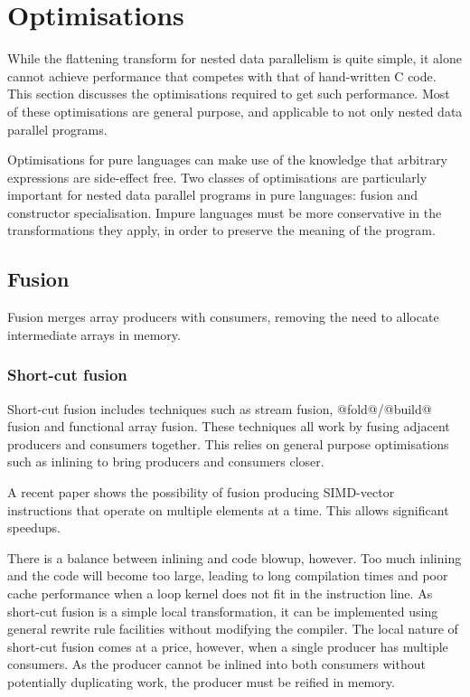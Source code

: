 \section{Optimisations}

While the flattening transform for nested data parallelism is quite simple,
it alone cannot achieve performance that competes with that of hand-written C code.
This section discusses the optimisations required to get such performance.
Most of these optimisations are general purpose, and applicable to not only nested data parallel programs.

Optimisations for pure languages can make use of the knowledge that arbitrary expressions are side-effect free.
Two classes of optimisations are particularly important for nested data parallel programs in pure languages: fusion and constructor specialisation.
Impure languages must be more conservative in the transformations they apply, in order to preserve the meaning of the program.


\subsection{Fusion}

Fusion merges array producers with consumers, removing the need to allocate intermediate arrays in memory.


\subsubsection{Short-cut fusion}

Short-cut fusion includes techniques such as stream fusion\cite{coutts2007streamfusion},
@fold@/@build@ fusion\cite{gill1993shortcut}
and functional array fusion\cite{chakravarty2001functional, chakravarty2003approach}.
These techniques all work by fusing adjacent producers and consumers together.
This relies on general purpose optimisations such as inlining to bring producers and consumers closer. 

A recent paper shows the possibility of fusion producing SIMD-vector instructions\cite{bik2004software} that operate on multiple elements at a time\cite{mainland2013haskell}.
This allows significant speedups.

There is a balance between inlining and code blowup, however.
Too much inlining and the code will become too large, leading to long compilation times and poor cache performance when a loop kernel does not fit in the instruction line.
As short-cut fusion is a simple local transformation, it can be implemented using general rewrite rule facilities\cite{jones2001playingby} without modifying the compiler.
The local nature of short-cut fusion comes at a price, however, when a single producer has multiple consumers.
As the producer cannot be inlined into both consumers without potentially duplicating work, the producer must be reified in memory.

